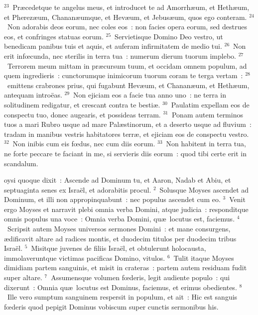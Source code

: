 ${}^{23}$~Pr\ae cedetque te angelus meus, et introducet te ad Amorrh\ae um, et Heth\ae um, et Pherez\ae um, Chanan\ae umque, et Hev\ae um, et Jebus\ae um, quos ego conteram.
${}^{24}$~Non adorabis deos eorum, nec coles eos~: non facies opera eorum, sed destrues eos, et confringes statuas eorum.
${}^{25}$~Servietisque Domino Deo vestro, ut benedicam panibus tuis et aquis, et auferam infirmitatem de medio tui.
${}^{26}$~Non erit infœcunda, nec sterilis in terra tua~: numerum dierum tuorum implebo.
${}^{27}$~Terrorem meum mittam in pr\ae cursum tuum, et occidam omnem populum, ad quem ingredieris~: cunctorumque inimicorum tuorum coram te terga vertam~:
${}^{28}$~emittens crabrones prius, qui fugabunt Hev\ae um, et Chanan\ae um, et Heth\ae um, antequam intro\"eas.
${}^{29}$~Non ejiciam eos a facie tua anno uno~: ne terra in solitudinem redigatur, et crescant contra te besti\ae .
${}^{30}$~Paulatim expellam eos de conspectu tuo, donec augearis, et possideas terram.
${}^{31}$~Ponam autem terminos tuos a mari Rubro usque ad mare Pal\ae stinorum, et a deserto usque ad fluvium~: tradam in manibus vestris habitatores terr\ae , et ejiciam eos de conspectu vestro.
${}^{32}$~Non inibis cum eis fœdus, nec cum diis eorum.
${}^{33}$~Non habitent in terra tua, ne forte peccare te faciant in me, si servieris diis eorum~: quod tibi certe erit in scandalum.

\bchapter
{}oysi quoque dixit~: Ascende ad Dominum tu, et Aaron, Nadab et Abiu, et septuaginta senes ex Isra\"el, et adorabitis procul.
${}^{2}$~Solusque Moyses ascendet ad Dominum, et illi non appropinquabunt~: nec populus ascendet cum eo.
${}^{3}$~Venit ergo Moyses et narravit plebi omnia verba Domini, atque judicia~: responditque omnis populus una voce~: Omnia verba Domini, qu\ae\ locutus est, faciemus.
${}^{4}$~Scripsit autem Moyses universos sermones Domini~: et mane consurgens, \ae dificavit altare ad radices montis, et duodecim titulos per duodecim tribus Isra\"el.
${}^{5}$~Misitque juvenes de filiis Isra\"el, et obtulerunt holocausta, immolaveruntque victimas pacificas Domino, vitulos.
${}^{6}$~Tulit itaque Moyses dimidiam partem sanguinis, et misit in crateras~: partem autem residuam fudit super altare.
${}^{7}$~Assumensque volumen fœderis, legit audiente populo~: qui dixerunt~: Omnia qu\ae\ locutus est Dominus, faciemus, et erimus obedientes.
${}^{8}$~Ille vero sumptum sanguinem respersit in populum, et ait~: Hic est sanguis fœderis quod pepigit Dominus vobiscum super cunctis sermonibus his.


